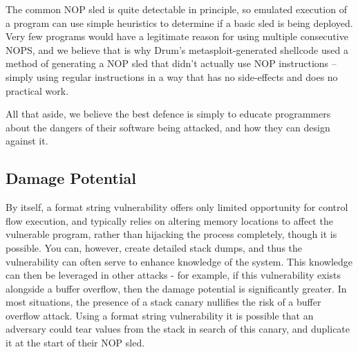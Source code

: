 The common NOP sled is quite detectable in principle, so emulated execution of a program can use simple heuristics to determine
if a basic sled is being deployed. Very few programs would have a legitimate reason for using multiple consecutive NOPS\cite{zip_quine},
and we believe that is why Drum's metasploit-generated shellcode used a method of generating a NOP sled that didn't actually
use NOP instructions -- simply using regular instructions in a way that has no side-effects and does no practical work\cite{wiki_sled}.

All that aside, we believe the best defence is simply to educate programmers about the dangers of their software being attacked, and
how they can design against it.

\subsection{Damage Potential}

By itself, a format string vulnerability offers only limited opportunity for control flow execution, and typically
relies on altering memory locations to affect the vulnerable program, rather than hijacking the process completely, though it is possible. You
can, however, create detailed stack dumps, and thus the vulnerability can often serve to enhance knowledge of the
system. This knowledge can then be leveraged in other attacks - for example, if this vulnerability exists alongside a
buffer overflow, then the damage potential is significantly greater. In most situations, the presence of a stack canary
nullifies the risk of a buffer overflow attack. Using a format string vulnerability it is possible that an adversary
could tear values from the stack in search of this canary, and duplicate it at the start of their NOP sled.
